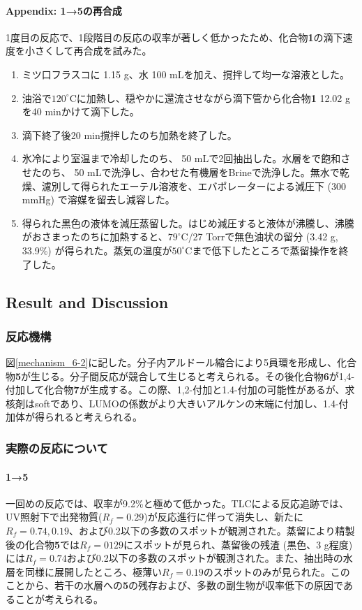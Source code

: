 \documentclass{ltjsarticle}
\theoremstyle{definition}
\numberwithin{equation}{section}
\newcommand{\D}{^\circ\text{C}}
\begin{document}
\paragraph{Appendix: \textbf{1}→\textbf{5}の再合成}
1度目の反応で、1段階目の反応の収率が著しく低かったため、化合物\textbf{1}の滴下速度を小さくして再合成を試みた。
\begin{enumerate}
\item ミツ口フラスコに 1.15 g、水 100 mLを加え、撹拌して均一な溶液とした。
\item 油浴で$120\D$に加熱し、穏やかに還流させながら滴下管から化合物\textbf{1} 12.02 gを40 minかけて滴下した。 
\item 滴下終了後20 min撹拌したのち加熱を終了した。
\item 氷冷により室温まで冷却したのち、 50 mLで2回抽出した。水層をで飽和させたのち、 50 mLで洗浄し、合わせた有機層をBrineで洗浄した。無水で乾燥、濾別して得られたエーテル溶液を、エバポレーターによる減圧下 (300 mmHg) で溶媒を留去し減容した。
\item 得られた黒色の液体を減圧蒸留した。はじめ減圧すると液体が沸騰し、沸騰がおさまったのちに加熱すると、$79\D$/27 Torrで無色油状の留分 (3.42 g, 33.9\%) が得られた。蒸気の温度が$50\D$まで低下したところで蒸留操作を終了した。
\end{enumerate}

\subsection{Result and Discussion}
\subsubsection{反応機構}
図\ref{mechanism_6-2}に記した。分子内アルドール縮合により5員環を形成し、化合物\textbf{5}が生じる。分子間反応が競合して生じると考えられる。その後化合物\textbf{6}が1,4-付加して化合物\textbf{7}が生成する。この際、1,2-付加と1.4-付加の可能性があるが、求核剤はsoftであり、LUMOの係数がより大きいアルケンの末端に付加し、1.4-付加体が得られると考えられる。

\subsubsection{実際の反応について}
\paragraph{\textbf{1}→\textbf{5}}
一回めの反応では、収率が9.2\%と極めて低かった。TLCによる反応追跡では、UV照射下で出発物質($R_f = 0.29$)が反応進行に伴って消失し、新たに$R_f = 0.74, 0.19$、および0.2以下の多数のスポットが観測された。蒸留により精製後の化合物\textbf{5}では$R_f = 0129$にスポットが見られ、蒸留後の残渣 (黒色、3 g程度) には$R_f = 0.74$および0.2以下の多数のスポットが観測された。また、抽出時の水層を同様に展開したところ、極薄い$R_f = 0.19$のスポットのみが見られた。このことから、若干の水層への\textbf{5}の残存および、多数の副生物が収率低下の原因であることが考えられる。
\end{document}
